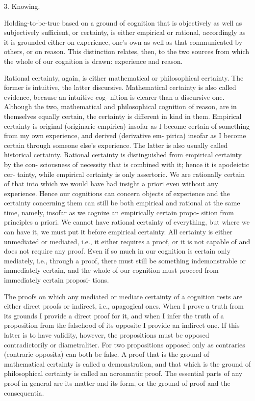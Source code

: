     3. Knowing.

    Holding-to-be-true based on a ground of cognition that is
    objectively as well as subjectively sufficient, or certainty, is
    either empirical or rational, accordingly as it is grounded either
    on experience, one's own as well as that communicated by others, or on reason.
    This distinction relates, then, to the two sources from which
    the whole of our cognition is drawn: experience and reason.

    Rational certainty, again, is either mathematical or philosophical certainty.
    The former is intuitive, the latter discursive.
    Mathematical certainty is also called evidence, because an intuitive cog-
    nition is clearer than a discursive one. Although the two, mathematical
    and philosophical cognition of reason, are in themselves equally certain,
    the certainty is different in kind in them.
    Empirical certainty is original (originarie empirica) insofar as I become
    certain of something from my own experience, and derived (derivative em-
    pirica) insofar as I become certain through someone else's experience. The
    latter is also usually called historical certainty.
    Rational certainty is distinguished from empirical certainty by the con-
    sciousness of necessity that is combined with it; hence it is apodeictic cer-
    tainty, while empirical certainty is only assertoric. We are rationally certain
    of that into which we would have had insight a priori even without any
    experience. Hence our cognitions can concern objects of experience and
    the certainty concerning them can still be both empirical and rational at
    the same time, namely, insofar as we cognize an empirically certain propo-
    sition from principles a priori.
    We cannot have rational certainty of everything, but where we can have
    it, we must put it before empirical certainty.
    All certainty is either unmediated or mediated, i.e., it either requires a
    proof, or it is not capable of and does not require any proof. Even if so
    much in our cognition is certain only mediately, i.e., through a proof,
    there must still be something indemonstrable or immediately certain, and the
    whole of our cognition must proceed from immediately certain proposi-
    tions.

    The proofs on which any mediated or mediate certainty of a cognition
    rests are either direct proofs or indirect, i.e., apagogical ones.
    When I prove a truth from its grounds I provide a direct proof for it,
    and when I infer the truth of a proposition from the falsehood of its
    opposite I provide an indirect one.
    If this latter is to have validity, however,
    the propositions must be opposed contradictorily or diametraliter.
    For two propositions opposed only as contraries (contrarie opposita) can both be false.
    A proof that is the ground of mathematical certainty is called a demonstration,
    and that which is the ground of philosophical certainty is called an acroamatic proof.
    The essential parts of any proof in general are its matter and its form,
    or the ground of proof and the consequentia.

